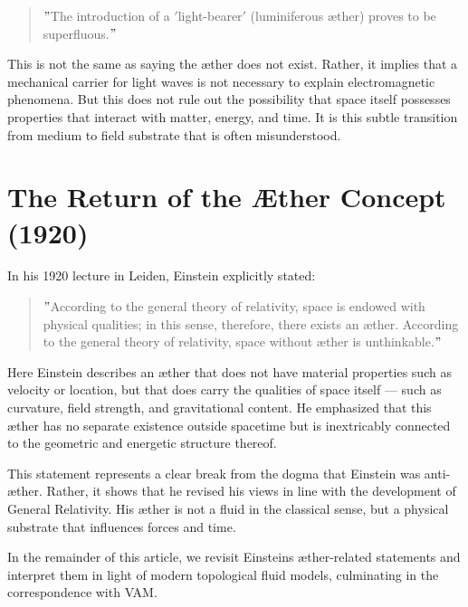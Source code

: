     \begin{quote}
        \("\)The introduction of a \('\)light-bearer\('\) (luminiferous æther) proves to be superfluous.\("\)
    \end{quote}

    This is not the same as saying the æther does not exist. Rather, it implies that a mechanical carrier for light waves is not necessary to explain electromagnetic phenomena. But this does not rule out the possibility that space itself possesses properties that interact with matter, energy, and time. It is this subtle transition from medium to field substrate that is often misunderstood.

    \section{The Return of the Æther Concept (1920)}

    In his 1920 lecture in Leiden, Einstein explicitly stated:

    \begin{quote}
        \("\)According to the general theory of relativity, space is endowed with physical qualities; in this sense, therefore, there exists an æther. According to the general theory of relativity, space without æther is unthinkable.\("\)~\cite{einstein1920aether}
    \end{quote}

    Here Einstein describes an æther that does not have material properties such as velocity or location, but that does carry the qualities of space itself — such as curvature, field strength, and gravitational content. He emphasized that this æther has no separate existence outside spacetime but is inextricably connected to the geometric and energetic structure thereof.

    This statement represents a clear break from the dogma that Einstein was anti-æther. Rather, it shows that he revised his views in line with the development of General Relativity. His æther is not a fluid in the classical sense, but a physical substrate that influences forces and time.

     In the remainder of this article, we revisit Einstein\rqs s æther-related statements and interpret them in light of modern topological fluid models, culminating in the correspondence with VAM.